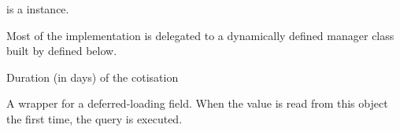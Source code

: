 \documentclass[letterpaper,10pt,english]{sphinxmanual}
\begin{document}
\begin{fulllineitems}
\begin{fulllineitems}
 is a  instance.

Most of the implementation is delegated to a dynamically defined manager
class built by  defined below.

\end{fulllineitems}


\begin{fulllineitems}
\label{\detokenize{modules/models:preferences.models.Cotisation.duration}}
Duration (in days) of the cotisation

\end{fulllineitems}


\begin{fulllineitems}
\label{\detokenize{modules/models:preferences.models.Cotisation.history}}
\end{fulllineitems}


\begin{fulllineitems}
\label{\detokenize{modules/models:preferences.models.Cotisation.id}}
A wrapper for a deferred-loading field. When the value is read from this
object the first time, the query is executed.

\end{fulllineitems}


\begin{fulllineitems}
\label{\detokenize{modules/models:preferences.models.Cotisation.objects}}
\end{fulllineitems}


\end{fulllineitems}
\end{document}
